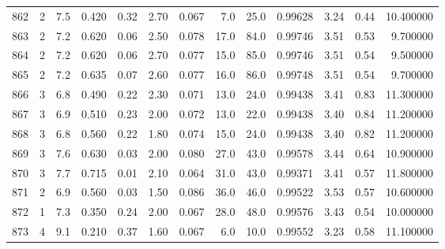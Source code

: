\begin{tabular}{lrrrrrrrrrrrr}
862  &        2 &            7.5 &             0.420 &         0.32 &            2.70 &      0.067 &                  7.0 &                  25.0 &  0.99628 &  3.24 &       0.44 &  10.400000 \\
863  &        2 &            7.2 &             0.620 &         0.06 &            2.50 &      0.078 &                 17.0 &                  84.0 &  0.99746 &  3.51 &       0.53 &   9.700000 \\
864  &        2 &            7.2 &             0.620 &         0.06 &            2.70 &      0.077 &                 15.0 &                  85.0 &  0.99746 &  3.51 &       0.54 &   9.500000 \\
865  &        2 &            7.2 &             0.635 &         0.07 &            2.60 &      0.077 &                 16.0 &                  86.0 &  0.99748 &  3.51 &       0.54 &   9.700000 \\
866  &        3 &            6.8 &             0.490 &         0.22 &            2.30 &      0.071 &                 13.0 &                  24.0 &  0.99438 &  3.41 &       0.83 &  11.300000 \\
867  &        3 &            6.9 &             0.510 &         0.23 &            2.00 &      0.072 &                 13.0 &                  22.0 &  0.99438 &  3.40 &       0.84 &  11.200000 \\
868  &        3 &            6.8 &             0.560 &         0.22 &            1.80 &      0.074 &                 15.0 &                  24.0 &  0.99438 &  3.40 &       0.82 &  11.200000 \\
869  &        3 &            7.6 &             0.630 &         0.03 &            2.00 &      0.080 &                 27.0 &                  43.0 &  0.99578 &  3.44 &       0.64 &  10.900000 \\
870  &        3 &            7.7 &             0.715 &         0.01 &            2.10 &      0.064 &                 31.0 &                  43.0 &  0.99371 &  3.41 &       0.57 &  11.800000 \\
871  &        2 &            6.9 &             0.560 &         0.03 &            1.50 &      0.086 &                 36.0 &                  46.0 &  0.99522 &  3.53 &       0.57 &  10.600000 \\
872  &        1 &            7.3 &             0.350 &         0.24 &            2.00 &      0.067 &                 28.0 &                  48.0 &  0.99576 &  3.43 &       0.54 &  10.000000 \\
873  &        4 &            9.1 &             0.210 &         0.37 &            1.60 &      0.067 &                  6.0 &                  10.0 &  0.99552 &  3.23 &       0.58 &  11.100000 \\

\end{tabular}
